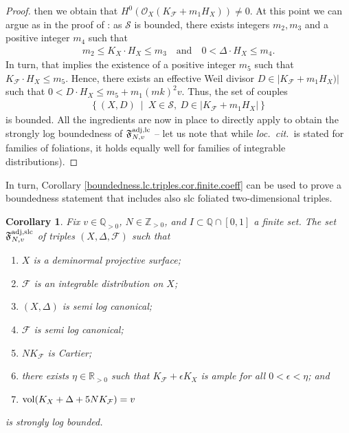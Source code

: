 \documentclass[12pt, a4paper]{amsart}
\newcommand{\setfoliation}[1]{\mathfrak F^{\rm adj, #1}_{N, v}}
\newcommand{\loccit}{{\it loc.~cit.}}
\newcounter{Theorem}
\newtheorem{corollary}[theorem]{Corollary}
\theoremstyle{definition}
\theoremstyle{named}
\begin{document}
\begin{proof}
	\noindent	then we obtain that 
		$H^0(\mathcal O_X(K_\mathcal{F}+m_1 H_X)) \neq 0$.
		At this point we can argue as in the proof of 
		\cite[Theorem 6.1]{SS23}:
		as $\mathcal S$ is bounded, there exists integers 
		$m_2, m_3$ and a positive integer
		$m_4$ such that 
		\begin{align*}
		m_2 \leq K_X \cdot H_X \leq m_3
		\quad 
		\text{and}
		\quad 
		0< \Delta \cdot H_X \leq m_4.
		\end{align*}
		In turn, that implies the existence of a positive integer $m_5$
		such that 
		$K_\mathcal{F} \cdot H_X \leq m_5$.
		Hence, there exists an effective Weil divisor
		$D \in 
		\vert K_\mathcal{F}+m_1 H_X)\vert$
		such that 
		$0< D \cdot H_X \leq m_5+m_1(mk)^2v$.
		Thus, the set of couples
		\begin{align*}
		\left \{
		(X, D) \
		\middle \vert \
		X \in \mathcal S, \ 
		D \in 
		\vert 
        K_\mathcal{F}+m_1 H_X
        \vert
		\right \}
		\end{align*}
		is bounded. 
		All the ingredients are now in place to directly apply
		\cite[Lemma 2.22]{SS23}
		to obtain the strongly log boundedness of  
		$\setfoliation{lc}$
		--
		let us note that while 
		\loccit\
		is stated for families of 	
		foliations, it holds equally well for families of integrable distributions).		
	\end{proof}


In turn, 
Corollary 
\ref{boundedness.lc.triples.cor.finite.coeff}
can be used to prove a boundedness statement that includes also slc foliated two-dimensional triples.

\begin{corollary}
\label{boundedness.slc.triples.cor}
Fix 
$v \in \mathbb Q_{>0}$, 
$N \in \mathbb Z_{>0}$, 
and 
$I \subset \mathbb Q \cap [0, 1]$
a finite set.
The set
$\setfoliation{slc}$
of triples 
$(X,  \Delta, \mathcal F)$ 
such that
\begin{enumerate}
\item 
$X$ is a deminormal projective surface; 
\item 
$\mathcal F$ is an integrable distribution on $X$;
\item 
$(X, \Delta)$ is semi log canonical;
\item 
$\mathcal F$ is semi log canonical;
\item 
$NK_{\mathcal F}$ is Cartier;
\item 
there exists $\eta \in \mathbb R_{>0}$ such that 
$K_\mathcal{F}+\epsilon K_X$ is ample for all $0< \epsilon < \eta$; and

\item 
\label{cond.vol.thm.slc.bound}
${\rm vol}(K_X+\Delta+5NK_{\mathcal F})=v$
\end{enumerate}
is strongly log bounded.
\end{corollary}
\end{document}
